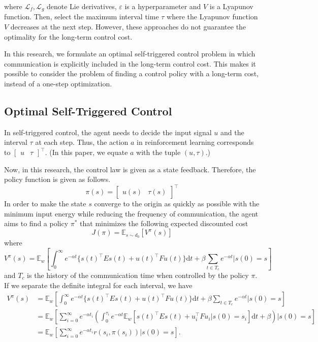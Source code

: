 \documentclass[english, dvipdfmx]{ampmt}             %
\newcommand{\expect}{\mathbb{E}}
\begin{document}
where $\mathcal{L}_f, \mathcal{L}_g$ denote Lie derivatives, $\varepsilon$ is a hyperparameter and $V$ is a Lyapunov function. Then, select the maximum interval time $\tau$ where the Lyapunov function $V$ decreases at the next step. However, these approaches do not guarantee the optimality for the long-term control cost. \par
In this research, we formulate an optimal self-triggered control problem in which communication is explicitly included in the long-term control cost. This makes it possible to consider the problem of finding a control policy with a long-term cost, instead of a one-step optimization.

\subsection{Optimal Self-Triggered Control}
\label{sec:formulation}
In self-triggered control, the agent needs to decide the input signal $u$ and the interval $\tau$ at each step. Thus, the action $a$ in reinforcement learning corresponds to $\begin{bmatrix}u & \tau \end{bmatrix}^{\top}$. (In this paper, we equate $a$ with the tuple $(u,\tau)$.) \par
Now, in this research, the control law is given as a state feedback. Therefore, the policy function is given as follows.
\begin{equation}
	\pi(s) = \begin{bmatrix}u(s) & \tau(s)\end{bmatrix}^{\top}
\end{equation}
In order to make the state $s$ converge to the origin as quickly as possible with the minimum input energy while reducing the frequency of communication, the agent aims to find a policy $\pi^{*}$ that minimizes the following expected discounted cost 
\begin{equation}
	J(\pi)=\expect_{s\sim d_0}[V^{\pi}(s)] \label{evaluation}
\end{equation}
where
\begin{equation}
	V^{\pi}(s) = \expect_{w}\left[\int_{0}^{\infty} e^{-\alpha t}\{s(t)^{\top}Es(t)+u(t)^{\top}Fu(t)\}\textrm{d}t + \beta\sum_{t\in T_c}e^{-\alpha t}|s(0)=s\right]\label{such_that}
\end{equation}
and $T_c$ is the history of the communication time when controlled by the policy $\pi$.  If we separate the definite integral for each interval, we have 
\begin{align}
	V^{\pi}(s) &= \expect_{w}\left[\int_{0}^{\infty} e^{-\alpha t}\{s(t)^{\top}Es(t)+u(t)^{\top}Fu(t)\}\textrm{d}t + \beta\sum_{t\in T_c}e^{-\alpha t}|s(0)=s\right] \nonumber \\
			 &= \expect_w\left[\sum_{i=0}^{\infty} e^{-\alpha t_i} \left(\int_{0}^{\tau_i}e^{-\alpha t}\expect_{w}[s(t)^{\top}Es(t)+u_i^{\top}Fu_i|s(0)=s_i]\textrm{d}t + \beta\right)|s(0)=s\right] \nonumber \\
			 &= \expect_w\left[\sum_{i=0}^{\infty} e^{-\alpha t_i} r(s_i, \pi(s_i))|s(0)=s\right] \label{self_acc_reward}.
\end{align}
\end{document}

